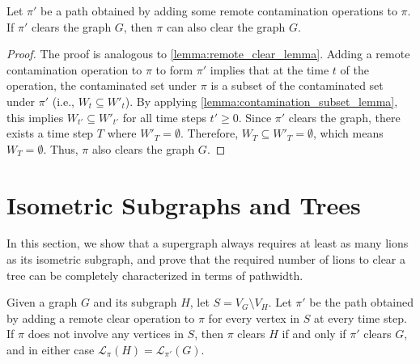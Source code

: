 \documentclass[a4paper,UKenglish,cleveref, autoref, thm-restate]{lipics-v2021}
\begin{document}
\begin{lemma}\label{lemma:remote_contaminate_lemma}
Let $\pi'$ be a path obtained by adding some remote contamination operations to $\pi$. If $\pi'$ clears the graph $G$, then $\pi$ can also clear the graph $G$.
\end{lemma}

\begin{proof}
The proof is analogous to \cref{lemma:remote_clear_lemma}. Adding a remote contamination operation to $\pi$ to form $\pi'$ implies that at the time $t$ of the operation, the contaminated set under $\pi$ is a subset of the contaminated set under $\pi'$ (i.e., $W_t \subseteq W'_t$). 
By applying \cref{lemma:contamination_subset_lemma}, this implies $W_{t'} \subseteq W'_{t'}$ for all time steps $t' \ge 0$. Since $\pi'$ clears the graph, there exists a time step $T$ where $W'_T = \emptyset$. Therefore, $W_T \subseteq W'_T = \emptyset$, which means $W_T = \emptyset$. Thus, $\pi$ also clears the graph $G$.
\end{proof}

\section{Isometric Subgraphs and Trees}\label{sec:tree}
In this section, we show that a supergraph always requires at least as many lions as its isometric subgraph, and prove that the required number of lions to clear a tree can be completely characterized in terms of pathwidth.

\begin{lemma}\label{lemma:constant_remote_lemma}
Given a graph $G$ and its subgraph $H$, let $S=V_G\setminus V_H$. Let $\pi'$ be the path obtained by adding a remote clear operation to $\pi$ for every vertex in $S$ at every time step. If $\pi$ does not involve any vertices in $S$, then $\pi$ clears $H$ if and only if $\pi'$ clears $G$, and in either case $\mathcal{L}_\pi(H) = \mathcal{L}_{\pi'}(G)$.
\end{lemma}
\end{document}
